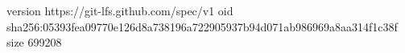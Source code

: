 version https://git-lfs.github.com/spec/v1
oid sha256:05393fea09770e126d8a738196a722905937b94d071ab986969a8aa314f1c38f
size 699208
